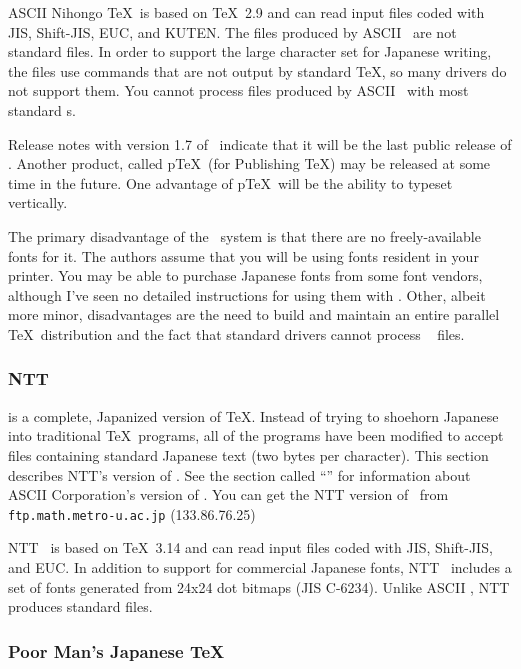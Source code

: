 ASCII Nihongo \TeX\ is based on \TeX\ 2.9 and can read input files coded with
JIS, Shift-JIS, EUC, and KUTEN.  The  files produced by ASCII \jtex\
are not standard  files.  In order to support the large character 
set for Japanese writing, the  files use commands that are not 
output by standard \TeX, so many drivers do not support them.
You cannot process \ext{DVI} files produced by ASCII \jtex\ with
most standard \dvidriver{}s.

Release notes with version 1.7 of \jtex\ indicate that it will be the last
public release of \jtex.  Another product, called p\TeX\ (for Publishing \TeX)
may be released at some time in the future.  One advantage of p\TeX\ will be
the ability to typeset vertically.

The primary disadvantage of the \jtex\ system is that there are no 
freely-available fonts for it.  The authors assume that you will be using fonts
resident in your printer.  You may be able to purchase Japanese fonts from
some font vendors, although I've seen no detailed instructions for using them
with \jtex.  Other, albeit more minor, disadvantages are the need to build and
maintain an entire parallel \TeX\ distribution and the fact that standard
 drivers cannot process \jtex\ \ext{DVI} files.

\subsubsection{NTT \jtex}
\label{sec:nttjtex}

\jtex{} is a 
complete, Japanized version of \TeX.  Instead of trying to
shoehorn Japanese into traditional \TeX\ programs, all of the programs have
been modified to accept files containing standard Japanese text (two bytes per
character).  This section describes NTT's version of 
\jtex.  See the section called ``'' for information
about ASCII Corporation's version of \jtex.
You can get the NTT version of \jtex\ from \verb|ftp.math.metro-u.ac.jp|
(133.86.76.25)

NTT \jtex\ is based on \TeX\ 3.14 and can read input files coded with JIS,
Shift-JIS, and EUC.  In addition to support for commercial Japanese fonts, NTT
\jtex\ includes a set of fonts generated from 24x24 dot bitmaps (JIS C-6234).
Unlike ASCII \jtex, NTT produces standard \ext{DVI} files.

\subsubsection{Poor Man's Japanese \protect\TeX}

